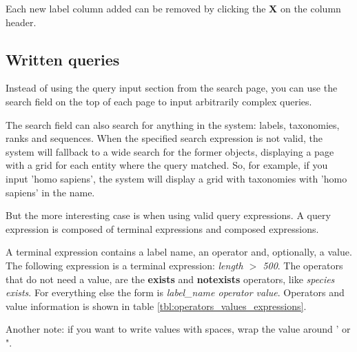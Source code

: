 Each new label column added can be removed by clicking the \textbf{X} on the column header.

\subsection{Written queries}

Instead of using the query input section from the search page, you can use the search field
on the top of each page to input arbitrarily complex queries.

The search field can also search for anything in the system: labels, taxonomies, ranks and sequences.
When the specified search expression is not valid, the system will fallback to a wide search for the
former objects, displaying a page with a grid for each entity where the query matched. So, for example,
if you input 'homo sapiens', the system will display a grid with taxonomies with 'homo sapiens' in the name.

But the more interesting case is when using valid query expressions. A query expression
is composed of terminal expressions and composed expressions.

A terminal expression contains a label name, an operator and, optionally, a value.
The following expression is a terminal expression: \textit{length $>$ 500}. The operators that
do not need a value, are the \textbf{exists} and \textbf{notexists} operators, like \textit{species exists}.
For everything else the form is \textit{label\_name operator value}. Operators and value information
is shown in table \ref{tbl:operators_values_expressions}.

Another note: if you want to write values with spaces, wrap the value around ' or ".

